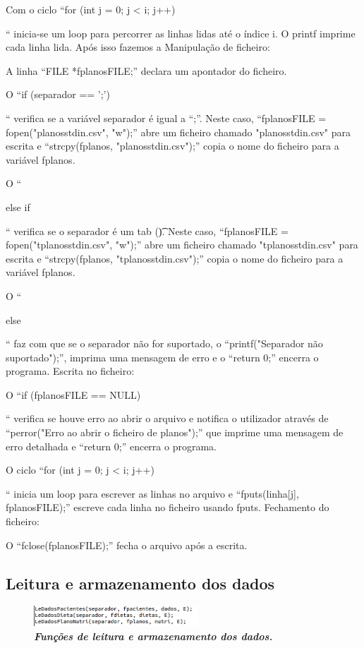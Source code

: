 \documentclass[a4wide]{report}
\begin{document}
Com o ciclo “for (int j = 0; j < i; j++) {“ inicia-se um loop para percorrer as linhas lidas até o índice i. O printf imprime cada linha lida. 
Após isso fazemos a Manipulação de ficheiro: 

 

A linha “FILE *fplanosFILE;” declara um apontador do ficheiro.  

O “if (separador == ';') {“ verifica se a variável separador é igual a “;”. Neste caso, “fplanosFILE = fopen("planosstdin.csv", "w");” abre um ficheiro chamado "planosstdin.csv" para escrita e “strcpy(fplanos, "planosstdin.csv");” copia o nome do ficheiro para a variável fplanos. 

O “} else if {“ verifica se o separador é um tab (\t). Neste caso, “fplanosFILE = fopen("tplanosstdin.csv", "w");” abre um ficheiro chamado "tplanosstdin.csv" para escrita e “strcpy(fplanos, "tplanosstdin.csv");” copia o nome do ficheiro para a variável fplanos. 

O “} else {“ faz com que se o separador não for suportado, o “printf("Separador não suportado");”, imprima uma mensagem de erro e o “return 0;” encerra o programa. 
Escrita no ficheiro: 

 

O “if (fplanosFILE == NULL) {“ verifica se houve erro ao abrir o arquivo e notifica o utilizador através de “perror("Erro ao abrir o ficheiro de planos");” que imprime uma mensagem de erro detalhada e “return 0;” encerra o programa. 

O ciclo “for (int j = 0; j < i; j++) {“ inicia um loop para escrever as linhas no arquivo e “fputs(linha[j], fplanosFILE);” escreve cada linha no ficheiro usando fputs. 
Fechamento do ficheiro: 

 

O “fclose(fplanosFILE);” fecha o arquivo após a escrita. 


\subsection{Leitura e armazenamento dos dados}
\Large

\begin{figure}[hbt]
    \centering
    \includegraphics[width=0.55\textwidth]{funcoes.png}
    \caption{\textbf{\textit{Funções de leitura e armazenamento dos dados.}}\label{fig:imagem}}
\end{figure}


}}}}
\end{document}
